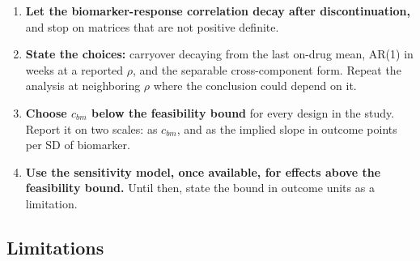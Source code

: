 \documentclass[
  11pt,
]{article}
\providecommand{\tightlist}{%
  \setlength{\itemsep}{0pt}\setlength{\parskip}{0pt}}
\begin{document}
\begin{enumerate}
\def\labelenumi{\arabic{enumi}.}
\tightlist
\item
  \textbf{Let the biomarker-response correlation decay after
  discontinuation,} and stop on matrices that are not positive
  definite.
\item
  \textbf{State the choices:} carryover decaying from the last on-drug
  mean, AR(1) in weeks at a reported \(\rho\), and the separable
  cross-component form. Repeat the analysis at neighboring \(\rho\)
  where the conclusion could depend on it.
\item
  \textbf{Choose \(c_{bm}\) below the feasibility bound} for every design in
  the study. Report it on two scales: as \(c_{bm}\), and as the implied
  slope in outcome points per SD of biomarker.
\item
  \textbf{Use the sensitivity model, once available, for effects above the
  feasibility bound.} Until then, state the bound in outcome units
  as a limitation.
\end{enumerate}

\subsection{Limitations}\label{limitations}
\end{document}
